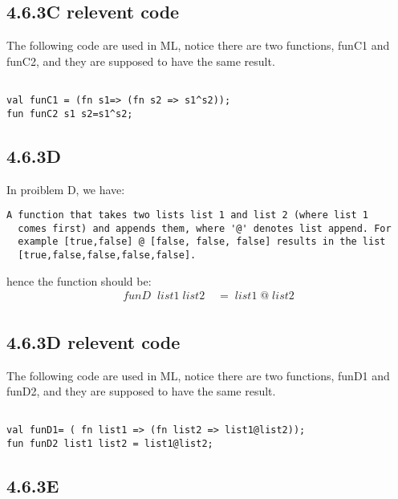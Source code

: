 \documentclass{report}
\begin{document}
\subsection{4.6.3C relevent code}
\label{sec:4.6.3c-relevent-code}
The following code are used in ML, notice there are two functions, funC1 and funC2, and they are supposed to have the same result.
\lstset{frameround=tttt}
\begin{lstlisting}[frame=tRBL]

val funC1 = (fn s1=> (fn s2 => s1^s2));
fun funC2 s1 s2=s1^s2;
\end{lstlisting}


\subsection{4.6.3D}
\label{sec:4.6.3d}
In proiblem D, we have:
\lstset{frameround=ffff}
\begin{lstlisting}[frame=trbl]
  A function that takes two lists list 1 and list 2 (where list 1
  comes first) and appends them, where '@' denotes list append. For
  example [true,false] @ [false, false, false] results in the list
  [true,false,false,false,false].
\end{lstlisting}
hence the function should be:
\begin{align*}
funD\;\; list1\;list2\;&=\;list1\;@\;list2\\
\end{align*}

\subsection{4.6.3D relevent code}
\label{sec:4.6.3d-relevent-code}
The following code are used in ML, notice there are two functions, funD1 and funD2, and they are supposed to have the same result.
\lstset{frameround=tttt}
\begin{lstlisting}[frame=TRBl]

val funD1= ( fn list1 => (fn list2 => list1@list2));
fun funD2 list1 list2 = list1@list2;
\end{lstlisting}




\subsection{4.6.3E}
\label{sec:4.6.3e}
\end{document}
